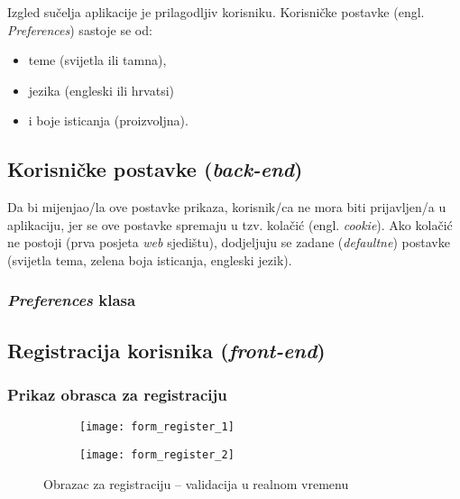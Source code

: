       Izgled sučelja aplikacije je prilagodljiv korisniku.
      Korisničke postavke (engl. \textit{Preferences}) sastoje se od:

      \begin{itemize}
        \item teme (svijetla ili tamna),
        \item jezika (engleski ili hrvatsi)
        \item i boje isticanja (proizvoljna).
      \end{itemize}


    \subsection{Korisničke postavke (\textit{back-end})}

      Da bi mijenjao/la ove postavke prikaza, korisnik/ca ne mora biti
      prijavljen/a u aplikaciju, jer se ove postavke spremaju u tzv. kolačić
      (engl. \textit{cookie}). Ako kolačić ne postoji (prva posjeta \textit{web}
      sjedištu), dodjeljuju se zadane (\textit{defaultne}) postavke (svijetla
      tema, zelena boja isticanja, engleski jezik).

      \subsubsection{\textit{Preferences} klasa}

        

  \subsection{Registracija korisnika (\textit{front-end})}

    \subsubsection{Prikaz obrasca za registraciju}

      \begin{figure}[h]
          \begin{subfigure}{0.5\textwidth}
            \texttt{[image: form\_register\_1]}
          \end{subfigure}
          \begin{subfigure}{0.5\textwidth}
            \texttt{[image: form\_register\_2]}
          \end{subfigure}

          \caption{Obrazac za registraciju -- validacija u realnom vremenu}
      \end{figure}


